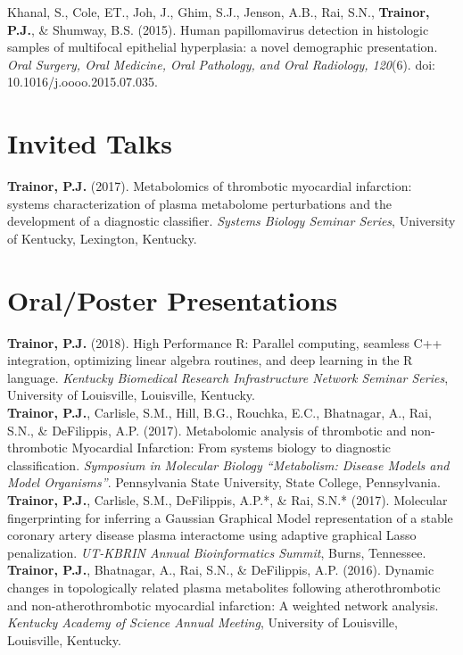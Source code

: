 Khanal, S., Cole, ET., Joh, J., Ghim, S.J., Jenson, A.B., Rai, S.N., \textbf{Trainor, P.J.}, \& Shumway, B.S. (2015). Human papillomavirus detection in histologic samples of multifocal epithelial hyperplasia: a novel demographic presentation. \emph{Oral Surgery, Oral Medicine, Oral Pathology, and Oral Radiology, 120}(6). doi: 10.1016/j.oooo.2015.07.035. \\

\section*{Invited Talks}
\textbf{Trainor, P.J.} (2017). Metabolomics of thrombotic myocardial infarction: systems characterization of plasma metabolome perturbations and the development of a diagnostic classifier. \emph{Systems Biology Seminar Series}, University of Kentucky, Lexington, Kentucky. \\

\section* {Oral/Poster Presentations}
\textbf{Trainor, P.J.} (2018). High Performance R: Parallel computing, seamless C++ integration, optimizing linear algebra routines, and deep learning in the R language. \emph{Kentucky Biomedical Research Infrastructure Network Seminar Series}, University of Louisville, Louisville, Kentucky. \\

\textbf{Trainor, P.J.}, Carlisle, S.M., Hill, B.G., Rouchka, E.C., Bhatnagar, A., Rai, S.N., \& DeFilippis, A.P. (2017). Metabolomic analysis of thrombotic and non-thrombotic Myocardial Infarction: From systems biology to diagnostic classification. \emph{Symposium in Molecular Biology ``Metabolism: Disease Models and Model Organisms''}. Pennsylvania State University, State College, Pennsylvania. \\

\textbf{Trainor, P.J.}, Carlisle, S.M., DeFilippis, A.P.*, \& Rai, S.N.* (2017). Molecular fingerprinting for inferring a Gaussian Graphical Model representation of a stable coronary artery disease plasma interactome using adaptive graphical Lasso penalization. \emph{UT-KBRIN Annual Bioinformatics Summit}, Burns, Tennessee. \\

\textbf{Trainor, P.J.}, Bhatnagar, A., Rai, S.N., \& DeFilippis, A.P. (2016). Dynamic changes in topologically related plasma metabolites following atherothrombotic and non-atherothrombotic myocardial infarction: A weighted network analysis. \emph{Kentucky Academy of Science Annual Meeting}, University of Louisville, Louisville, Kentucky. \\

